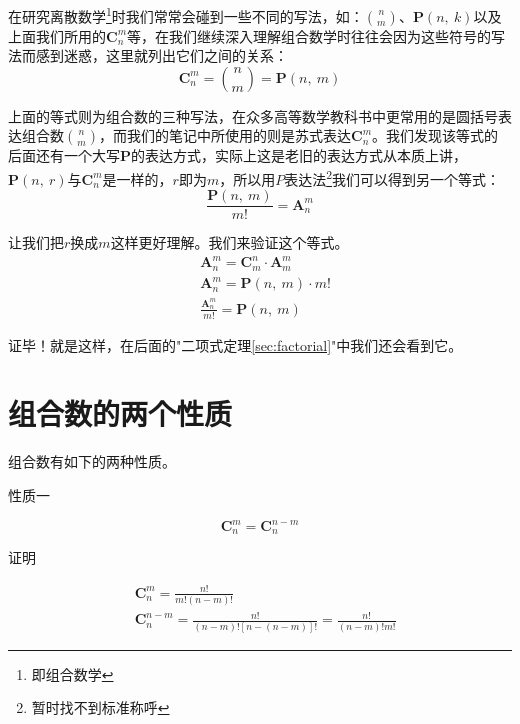 在研究离散数学\footnote{即组合数学}时我们常常会碰到一些不同的写法，如：$\binom{n}{m}$、$\textbf{P}(n,~k)$以及上面我们所用的$\textbf{C}_{n}^m$等，在我们继续深入理解组合数学时往往会因为这些符号的写法而感到迷惑，这里就列出它们之间的关系：
\begin{equation*}
    \textbf{C}_{n}^{m} = \binom{n}{m} = \textbf{P}(n,~m)
\end{equation*}

上面的等式则为组合数的三种写法，在众多高等数学教科书中更常用的是圆括号表达组合数$\binom{n}{m}$，而我们的笔记中所使用的则是苏式表达$\textbf{C}_{n}^m$。我们发现该等式的后面还有一个大写$\textbf{P}$的表达方式，实际上这是老旧的表达方式从本质上讲，$\textbf{P}(n,~r)$与$\textbf{C}_{n}^m$是一样的，$r$即为$m$，所以用$P$表达法\footnote{暂时找不到标准称呼}我们可以得到另一个等式：
\begin{equation*}
    \frac{\textbf{P}(n,~m)}{m!} = \textbf{A}_{n}^m
\end{equation*}

让我们把$r$换成$m$这样更好理解。我们来验证这个等式。
\begin{equation*}
    \begin{aligned}
        &\textbf{A}_{n}^m = \textbf{C}_{m}^n \cdot \textbf{A}_{m}^{m} \\
        &\textbf{A}_{n}^m = \textbf{P}(n,~m) \cdot m! \\
        &\frac{\textbf{A}_{n}^m}{m!} = \textbf{P}(n,~m)
    \end{aligned}
\end{equation*}

证毕！就是这样，在后面的"二项式定理\ref{sec:factorial}"中我们还会看到它。

\section{组合数的两个性质}

组合数有如下的两种性质。
\begin{flushleft}{\color{blue} 性质一}\end{flushleft}
\begin{equation}
    \textbf{C}_{n}^{m}=\textbf{C}_{n}^{n-m}
\end{equation}
\begin{flushleft}
	{\color{blue} 证明}
\end{flushleft}
\begin{equation*}
    \begin{aligned}
        &\textbf{C}_{n}^{m} = \frac{n!}{m!(n-m)!} \\
        &\textbf{C}_{n}^{n-m} = \frac{n!}{(n-m)![n-(n-m)]!} = \frac{n!}{(n-m)!m!}
    \end{aligned}
\end{equation*}

